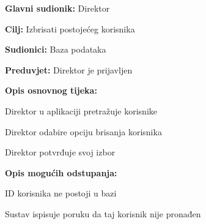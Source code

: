 			
			\noindent {}
			\begin{packed_item}
				
				\item \textbf{Glavni sudionik: } Direktor
				\item  \textbf{Cilj:} Izbrisati postojećeg korisnika
				\item  \textbf{Sudionici:} Baza podataka
				\item  \textbf{Preduvjet:} Direktor je prijavljen
				\item  \textbf{Opis osnovnog tijeka:}
				
				\item[] \begin{packed_enum}
					
					\item Direktor u aplikaciji pretražuje korisnike
					\item Direktor odabire opciju brisanja korisnika
					\item Direktor potvrđuje svoj izbor
				\end{packed_enum}
				
				\item  \textbf{Opis mogućih odstupanja:}
				
				\item[] \begin{packed_item}
					
					\item[2.a] ID korisnika ne postoji u bazi
					\item[] \begin{packed_enum}
						
						\item Sustav ispisuje poruku da taj korisnik nije pronađen
						
					\end{packed_enum}
					
				\end{packed_item}
			\end{packed_item}
			
